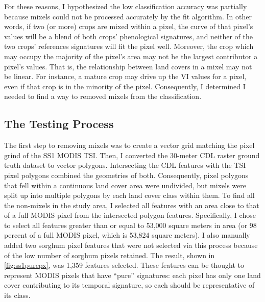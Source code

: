 For these reasons, I hypothesized the low classification accuracy was partially because mixels could not be processed accurately by the fit algorithm. In other words, if two (or more) crops are mixed within a pixel, the curve of that pixel’s values will be a blend of both crops’ phenological signatures, and neither of the two crops' references signatures will fit the pixel well. Moreover, the crop which may occupy the majority of the pixel's area may not be the largest contributor a pixel’s values. That is, the relationship between land covers in a mixel may not be linear. For instance, a mature crop may drive up the VI values for a pixel, even if that crop is in the minority of the pixel. Consequently, I determined I needed to find a way to removed mixels from the classification.


\subsection*{The Testing Process}

The first step to removing mixels was to create a vector grid matching the pixel grind of the SS1 MODIS TSI. Then, I converted the 30-meter CDL raster ground truth dataset to vector polygons. Intersecting the CDL features with the TSI pixel polygons combined the geometries of both. Consequently, pixel polygons that fell within a continuous land cover area were undivided, but mixels were split up into multiple polygons by each land cover class within them. To find all the non-mixels in the study area, I selected all features with an area close to that of a full MODIS pixel from the intersected polygon features. Specifically, I chose to select all features greater than or equal to 53,000 square meters in area (or 98 percent of a full MODIS pixel, which is 53,824 square meters). I also manually added two sorghum pixel features that were not selected via this process because of the low number of sorghum pixels retained. The result, shown in \autoref{fig:ss1purepx}, was 1,359 features selected. These features can be thought to represent MODIS pixels that have ``pure'' signatures: each pixel has only one land cover contributing to its temporal signature, so each should be representative of its class.

